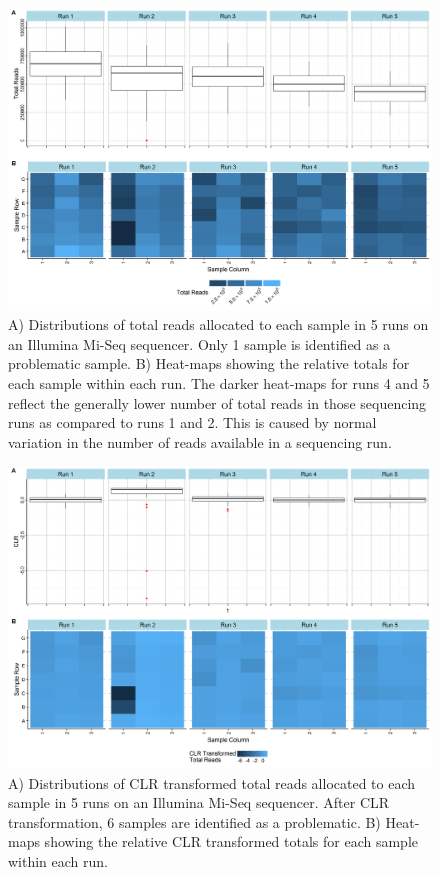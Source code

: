 \documentclass [10pt]{article}
\theoremstyle{definition}
\begin{document}
\begin{figure}
\includegraphics[scale=.5]{./Figures/IO_Repro_Combined_RawTotals}
\caption{A) Distributions of total reads allocated to each sample in 5 runs on an Illumina Mi-Seq sequencer. Only 1 sample is identified as a problematic sample. B) Heat-maps showing the relative totals for each sample within each run.  The darker heat-maps for runs 4 and 5 reflect the generally lower number of total reads in those sequencing runs as compared to runs 1 and 2.  This is caused by normal variation in the number of reads available in a sequencing run.}
\label{totalFig}
\end{figure}
 
\begin{figure}
\includegraphics[scale=.5]{./Figures/IO_Repro_Combined_CLR}
\caption{A) Distributions of CLR transformed total reads allocated to each sample in 5 runs on an Illumina Mi-Seq sequencer. After CLR transformation, 6 samples are identified as a problematic. B) Heat-maps showing the relative CLR transformed totals for each sample within each run.}
\label{clrFig}
\end{figure}
\end{document}
